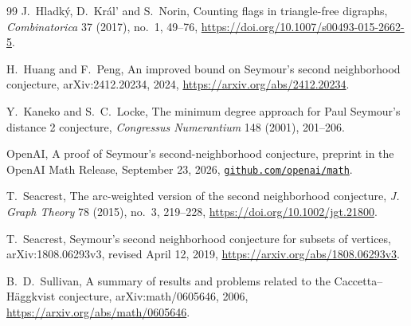 \documentclass[11pt]{amsart}
\theoremstyle{remark}
\begin{document}
\begin{thebibliography}{99}
J.~Hladk\'y, D.~Kr\'al' and S.~Norin, Counting flags in triangle-free digraphs,
\emph{Combinatorica} 37 (2017), no.~1, 49--76,
\url{https://doi.org/10.1007/s00493-015-2662-5}.

H.~Huang and F.~Peng, An improved bound on Seymour's second neighborhood
conjecture, arXiv:2412.20234, 2024,
\url{https://arxiv.org/abs/2412.20234}.

Y.~Kaneko and S.~C.~Locke, The minimum degree approach for Paul Seymour's
distance 2 conjecture, \emph{Congressus Numerantium} 148 (2001), 201--206.

OpenAI, A proof of Seymour's second-neighborhood conjecture, preprint in the
OpenAI Math Release, September 23, 2026,
\href{https://github.com/openai/math/blob/main/preprints/A-proof-of-Seymours-second-neighborhood-conjecture-September-23-2026/paper.pdf}{\nolinkurl{github.com/openai/math}}.

T.~Seacrest, The arc-weighted version of the second neighborhood conjecture,
\emph{J. Graph Theory} 78 (2015), no.~3, 219--228,
\url{https://doi.org/10.1002/jgt.21800}.

T.~Seacrest, Seymour's second neighborhood conjecture for subsets of
vertices, arXiv:1808.06293v3, revised April 12, 2019,
\url{https://arxiv.org/abs/1808.06293v3}.

B.~D.~Sullivan, A summary of results and problems related to the
Caccetta--H\"aggkvist conjecture, arXiv:math/0605646, 2006,
\url{https://arxiv.org/abs/math/0605646}.
\end{thebibliography}
\end{document}
